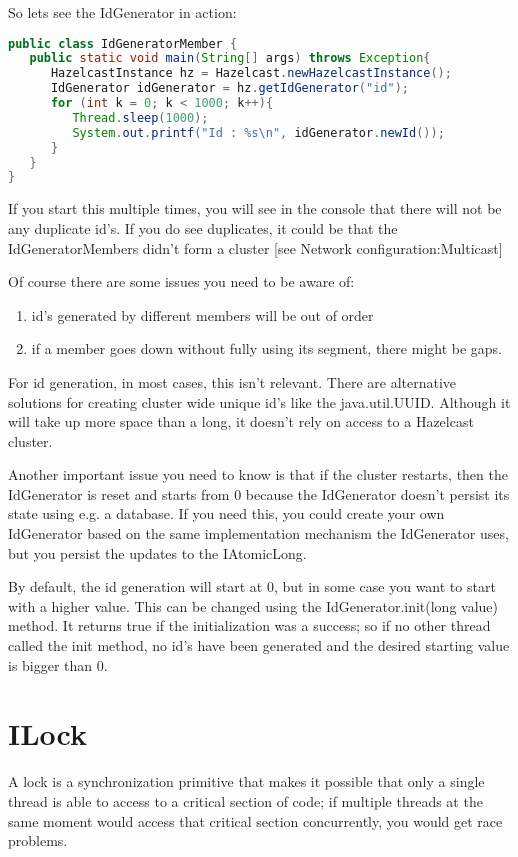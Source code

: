 So lets see the IdGenerator in action:
\begin{lstlisting}[language=java]
public class IdGeneratorMember {
   public static void main(String[] args) throws Exception{
      HazelcastInstance hz = Hazelcast.newHazelcastInstance();
      IdGenerator idGenerator = hz.getIdGenerator("id");
      for (int k = 0; k < 1000; k++){
         Thread.sleep(1000);
         System.out.printf("Id : %s\n", idGenerator.newId());
      }
   }
}
\end{lstlisting}
If you start this multiple times, you will see in the console that there will not be any duplicate id's. If you do see duplicates, it could be that the IdGeneratorMembers didn't form a cluster [see Network configuration:Multicast]

Of course there are some issues you need to be aware of:
\begin{enumerate}
\item id's generated by different members will be out of order
\item if a member goes down without fully using its segment, there might be gaps.
\end{enumerate}
For id generation, in most cases, this isn't relevant. There are alternative solutions for creating cluster wide unique id's like the java.util.UUID. Although it will take up more space than a long, it doesn't rely on access to a Hazelcast cluster.

Another important issue you need to know is that if the cluster restarts, then the IdGenerator is reset and starts from 0 because the IdGenerator doesn't persist its state using e.g. a database. If you need this, you could create your own IdGenerator based on the same implementation mechanism the IdGenerator uses, but you persist the updates to the IAtomicLong.

By default, the id generation will start at 0, but in some case you want to start with a higher value. This can be changed using the IdGenerator.init(long value) method. It returns true if the initialization was a success; so if no other thread called the init method, no id's have been generated and the desired starting value is bigger than 0.

\section{ILock}
A lock is a synchronization primitive that makes it possible that only a single thread is able to access to a critical section of code; if multiple threads at the same moment would access that critical section concurrently, you would get race problems. 


